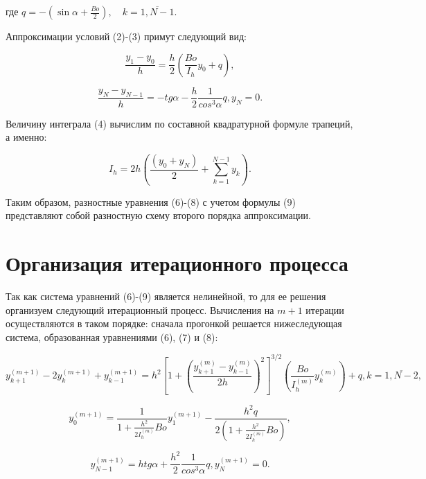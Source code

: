\documentclass{article}
\begin{document}
\begin{center}
где $q = -\left(\sin\alpha + \frac{Bo}{2}\right), \quad k = \overline{1, N-1}.$ \\
\end{center}

Аппроксимации условий (2)-(3) примут следующий вид:

\begin{equation}
    \frac{y_1 - y_0}{h} = \frac{h}{2}\left(\frac{Bo}{I_h}y_0 + q\right),
\end{equation}

\begin{equation}
    \frac{y_N - y_{N - 1}}{h} = -tg\alpha - \frac{h}{2}\frac{1}{cos^3\alpha}q, y_N = 0.
\end{equation}

Величину интеграла (4) вычислим по составной квадратурной формуле трапеций, а именно: 

\begin{equation}
    I_h = 2h\left(\frac{(y_0 + y_N)}{2} + \sum\limits_{k=1}^{N-1} y_k\right).
\end{equation}

Таким образом, разностные уравнения (6)-(8) с учетом формулы (9) представляют собой разностную схему второго порядка аппроксимации.

\section{Организация итерационного процесса}

Так как система уравнений (6)-(9) является нелинейной, то для ее решения организуем следующий итерационный процесс. Вычисления на $m + 1$ итерации осуществляются в таком
порядке: сначала прогонкой решается нижеследующая система, образованная уравнениями (6), (7) и (8):

\begin{equation}
    y_{k+1}^{(m+1)} - 2y_k^{(m+1)} + y_{k-1}^{(m+1)} = h^2 \left[ 1 + \left(\frac{y_{k+1}^{(m)} - y_{k-1}^{(m)}}{2h}\right)^2\right]^{3/2}\left(\frac{Bo}{I_h^{(m)}}y_k^{(m)}\right) + q, k = \overline{1, N-2},
\end{equation}

\begin{equation}
    y_0^{(m+1)} = \frac{1}{1 + \frac{h^2}{2I_h^{(m)}}Bo} y_1^{(m+1)} - \frac{h^2q}{2\left(1+\frac{h^2}{2I_h^{(m)}}Bo\right)},
\end{equation}

\begin{equation}
    y_{N-1}^{(m+1)} = htg\alpha + \frac{h^2}{2}\frac{1}{cos^3\alpha}q, y_N^{(m+1)} = 0.
\end{equation}
\end{document}
